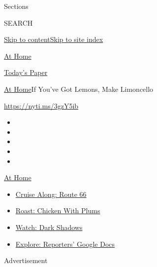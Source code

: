Sections

SEARCH

\protect\hyperlink{site-content}{Skip to
content}\protect\hyperlink{site-index}{Skip to site index}

\href{https://www.nytimes3xbfgragh.onion/spotlight/at-home}{At Home}

\href{https://myaccount.nytimes3xbfgragh.onion/auth/login?response_type=cookie\&client_id=vi}{}

\href{https://www.nytimes3xbfgragh.onion/section/todayspaper}{Today's
Paper}

\href{/spotlight/at-home}{At Home}\textbar{}If You've Got Lemons, Make
Limoncello

\url{https://nyti.ms/3gzY5ib}

\begin{itemize}
\item
\item
\item
\item
\item
\end{itemize}

\href{https://www.nytimes3xbfgragh.onion/spotlight/at-home?action=click\&pgtype=Article\&state=default\&region=TOP_BANNER\&context=at_home_menu}{At
Home}

\begin{itemize}
\tightlist
\item
  \href{https://www.nytimes3xbfgragh.onion/2020/09/07/travel/route-66.html?action=click\&pgtype=Article\&state=default\&region=TOP_BANNER\&context=at_home_menu}{Cruise
  Along: Route 66}
\item
  \href{https://www.nytimes3xbfgragh.onion/2020/09/04/dining/sheet-pan-chicken.html?action=click\&pgtype=Article\&state=default\&region=TOP_BANNER\&context=at_home_menu}{Roast:
  Chicken With Plums}
\item
  \href{https://www.nytimes3xbfgragh.onion/2020/09/04/arts/television/dark-shadows-stream.html?action=click\&pgtype=Article\&state=default\&region=TOP_BANNER\&context=at_home_menu}{Watch:
  Dark Shadows}
\item
  \href{https://www.nytimes3xbfgragh.onion/interactive/2020/at-home/even-more-reporters-editors-diaries-lists-recommendations.html?action=click\&pgtype=Article\&state=default\&region=TOP_BANNER\&context=at_home_menu}{Explore:
  Reporters' Google Docs}
\end{itemize}

Advertisement

